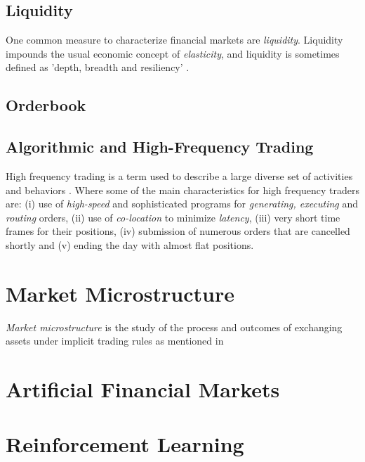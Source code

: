 \documentclass{kththesis}
\theoremstyle{definition}
\begin{document}
\subsection{Liquidity}
One common measure to characterize financial markets are \textit{liquidity}. Liquidity impounds the usual economic concept of \textit{elasticity}, and liquidity is sometimes defined as 'depth, breadth and resiliency' \parencite{hasbrouck2007empirical}.

\subsection{Orderbook}

\subsection{Algorithmic and High-Frequency Trading}
High frequency trading is a term used to describe a large diverse set of activities and behaviors \parencite{o2015high}. Where some of the main characteristics for high frequency traders are: (i) use of \textit{high-speed} and sophisticated programs for \textit{generating, executing} and \textit{routing} orders, (ii) use of \textit{co-location} to minimize \textit{latency}, (iii) very short time frames for their positions, (iv) submission of numerous orders that are cancelled shortly and (v) ending the day with almost flat positions.




\section{Market Microstructure}
\textit{Market microstructure} is the study of the process and outcomes of exchanging assets under implicit trading rules as mentioned in\textcite{o1995market}

\section{Artificial Financial Markets}


\section{Reinforcement Learning}
\end{document}
